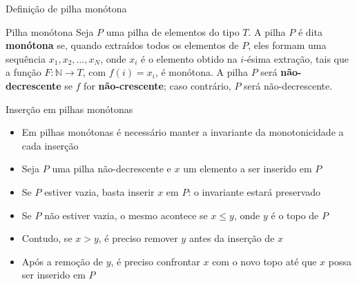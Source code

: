 \begin{frame}[fragile]{Definição de pilha monótona}

    \begin{block}{Pilha monótona}
        Seja $P$ uma pilha de elementos do tipo $T$. A pilha $P$ é dita \textbf{monótona} se, quando extraídos todos
        os elementos de $P$, eles formam uma sequência $x_1, x_2, \ldots, x_N$, onde $x_i$ é o elemento
        obtido na $i$-ésima extração, tais que a função $F : \mathbb{N}\to T$, com $f(i) = x_i$, é monótona.
        \newline\newline
        A pilha $P$ será \textbf{não-decrescente} se $f$ for \textbf{não-crescente}; caso contrário, $P$ será
        não-decrescente.
    \end{block}

\end{frame}


\begin{frame}[fragile]{Inserção em pilhas monótonas}

    \begin{itemize}
        \item Em pilhas monótonas é necessário manter a invariante da monotonicidade a cada inserção

        \item Seja $P$ uma pilha não-decrescente e $x$ um elemento a ser inserido em $P$

        \item Se $P$ estiver vazia, basta inserir $x$ em $P$: o invariante estará preservado

        \item Se $P$ não estiver vazia, o mesmo acontece se $x\leq y$, onde $y$ é o topo de $P$ 

        \item Contudo, se $x > y$, é preciso remover $y$ antes da inserção de $x$

        \item Após a remoção de $y$, é preciso confrontar $x$ com o novo topo até que $x$ possa ser
            inserido em $P$
    \end{itemize}
\end{frame}



